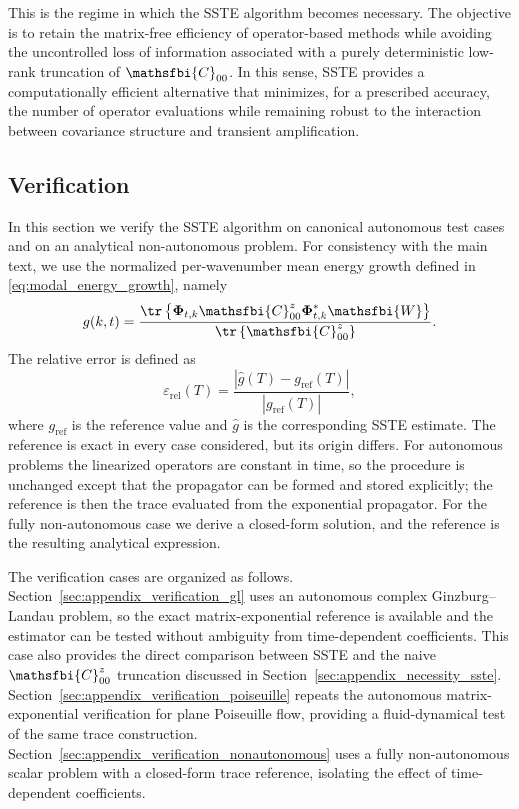 \begin{appendices}
This is the regime in which the SSTE algorithm becomes necessary. The objective is to retain the matrix-free efficiency of operator-based methods while avoiding the uncontrolled loss of information associated with a purely deterministic low-rank truncation of \(\mathsfbi{C}_{00}\). In this sense, SSTE provides a computationally efficient alternative that minimizes, for a prescribed accuracy, the number of operator evaluations while remaining robust to the interaction between covariance structure and transient amplification.

\subsection{Verification}
\label{sec:appendix_verification}
In this section we verify the SSTE algorithm on canonical autonomous test cases and on an analytical non-autonomous problem. For consistency with the main text, we use the normalized per-wavenumber mean energy growth defined in \eqref{eq:modal_energy_growth}, namely
\begin{equation}
  g(k,t)
  =
  \frac{
    \tr
    \left\{
      \boldsymbol{\Phi}_{t,k}
      \mathsfbi{C}_{00}^{z}
      \boldsymbol{\Phi}_{t,k}^{*}
      \mathsfbi{W}
    \right\}
  }{
    \tr
    \left\{
      \mathsfbi{C}_{00}^{z}
    \right\}
  }.
  \label{eq:verification_modal_energy_growth}
\end{equation}
The relative error is defined as
\begin{equation}
  \varepsilon_{\mathrm{rel}}(T)
  =
  \frac{
    \left|\widehat{g}(T)-g_{\mathrm{ref}}(T)\right|
  }{
    \left|g_{\mathrm{ref}}(T)\right|
  },
  \label{eq:verification_relative_error}
\end{equation}
where \(g_{\mathrm{ref}}\) is the reference value and \(\widehat{g}\) is the corresponding SSTE estimate. The reference is exact in every case considered, but its origin differs. For autonomous problems the linearized operators are constant in time, so the procedure is unchanged except that the propagator can be formed and stored explicitly; the reference is then the trace evaluated from the exponential propagator. For the fully non-autonomous case we derive a closed-form solution, and the reference is the resulting analytical expression.

The verification cases are organized as follows. Section~\ref{sec:appendix_verification_gl} uses an autonomous complex Ginzburg--Landau problem, so the exact matrix-exponential reference is available and the estimator can be tested without ambiguity from time-dependent coefficients. This case also provides the direct comparison between SSTE and the naive \(\mathsfbi{C}_{00}^{z}\) truncation discussed in Section~\ref{sec:appendix_necessity_sste}. Section~\ref{sec:appendix_verification_poiseuille} repeats the autonomous matrix-exponential verification for plane Poiseuille flow, providing a fluid-dynamical test of the same trace construction. Section~\ref{sec:appendix_verification_nonautonomous} uses a fully non-autonomous scalar problem with a closed-form trace reference, isolating the effect of time-dependent coefficients.


\end{appendices}
